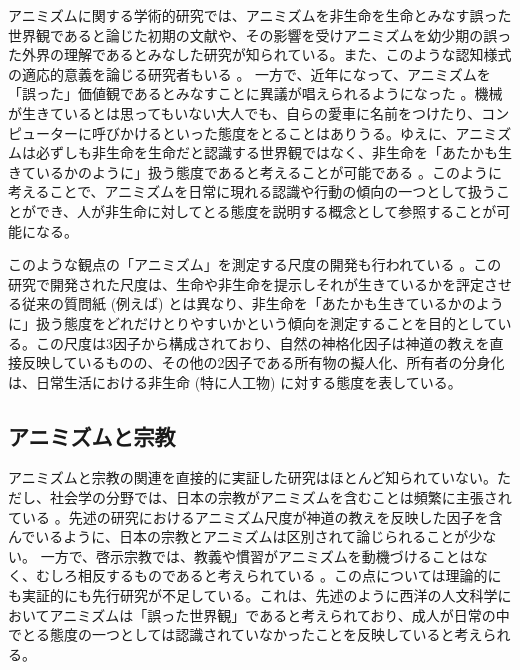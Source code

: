 \documentclass[a4j,12pt]{jreport}
\begin{document}
アニミズムに関する学術的研究では、アニミズムを非生命を生命とみなす誤った世界観であると論じた初期の文献\cite{tylor}や、その影響を受けアニミズムを幼少期の誤った外界の理解であるとみなした研究\cite{piag}が知られている。また、このような認知様式の適応的意義を論じる研究者もいる\cite{guth} 。
一方で、近年になって、アニミズムを「誤った」価値観であるとみなすことに異議が唱えられるようになった\cite{bird} 。機械が生きているとは思ってもいない大人でも、自らの愛車に名前をつけたり、コンピューターに呼びかけるといった態度をとることはありうる。ゆえに、アニミズムは必ずしも非生命を生命だと認識する世界観ではなく、非生命を「あたかも生きているかのように」扱う態度であると考えることが可能である\cite{bird} 。このように考えることで、アニミズムを日常に現れる認識や行動の傾向の一つとして扱うことができ、人が非生命に対してとる態度を説明する概念として参照することが可能になる。


このような観点の「アニミズム」を測定する尺度の開発も行われている\cite{ikeuchi} 。この研究で開発された尺度は、生命や非生命を提示しそれが生きているかを評定させる従来の質問紙 (例えば\cite{macdo}) とは異なり、非生命を「あたかも生きているかのように」扱う態度をどれだけとりやすいかという傾向を測定することを目的としている。この尺度は3因子から構成されており、自然の神格化因子は神道の教えを直接反映しているものの、その他の2因子である所有物の擬人化、所有者の分身化は、日常生活における非生命 (特に人工物) に対する態度を表している。

\subsection{アニミズムと宗教}
アニミズムと宗教の関連を直接的に実証した研究はほとんど知られていない。ただし、社会学の分野では、日本の宗教がアニミズムを含むことは頻繁に主張されている\cite{abe, umehara, hosaka} 。先述の研究におけるアニミズム尺度が神道の教えを反映した因子を含んでいるように\cite{ikeuchi}、日本の宗教とアニミズムは区別されて論じられることが少ない。
一方で、啓示宗教では、教義や慣習がアニミズムを動機づけることはなく、むしろ相反するものであると考えられている\cite{abe, allison} 。この点については理論的にも実証的にも先行研究が不足している。これは、先述のように西洋の人文科学においてアニミズムは「誤った世界観」であると考えられており、成人が日常の中でとる態度の一つとしては認識されていなかったことを反映していると考えられる。
\end{document}
